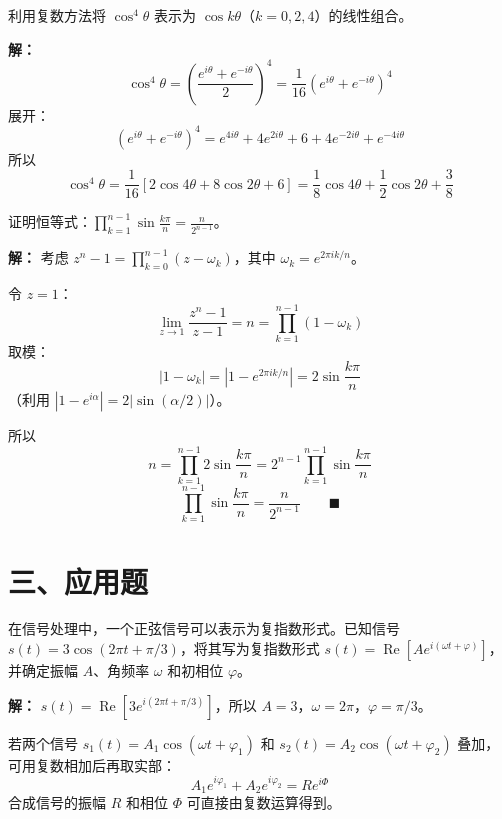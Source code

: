\documentclass[12pt, a4paper]{ctexart}
\begin{document}
\begin{examplebox}
利用复数方法将 $\cos^4\theta$ 表示为 $\cos k\theta$（$k=0,2,4$）的线性组合。
\end{examplebox}

\textbf{解：}
\[
  \cos^4\theta = \left(\frac{e^{i\theta}+e^{-i\theta}}{2}\right)^4
  = \frac{1}{16}(e^{i\theta}+e^{-i\theta})^4
\]
展开：
\[
  (e^{i\theta}+e^{-i\theta})^4 = e^{4i\theta}+4e^{2i\theta}+6+4e^{-2i\theta}+e^{-4i\theta}
\]
所以
\[
  \cos^4\theta = \frac{1}{16}\left[2\cos 4\theta + 8\cos 2\theta + 6\right]
  = \boxed{\frac{1}{8}\cos 4\theta + \frac{1}{2}\cos 2\theta + \frac{3}{8}}
\]

\begin{examplebox}[【例题10】综合——复数与三角恒等式]
证明恒等式：$\displaystyle\prod_{k=1}^{n-1}\sin\frac{k\pi}{n} = \frac{n}{2^{n-1}}$。
\end{examplebox}

\textbf{解：}
考虑 $z^n-1 = \displaystyle\prod_{k=0}^{n-1}(z-\omega_k)$，其中 $\omega_k=e^{2\pi ik/n}$。

令 $z=1$：
\[
  \lim_{z\to 1}\frac{z^n-1}{z-1} = n = \prod_{k=1}^{n-1}(1-\omega_k)
\]
取模：
\[
  |1-\omega_k| = |1-e^{2\pi ik/n}| = 2\sin\frac{k\pi}{n}
\]
（利用 $|1-e^{i\alpha}|=2|\sin(\alpha/2)|$）。

所以
\[
  n = \prod_{k=1}^{n-1}2\sin\frac{k\pi}{n} = 2^{n-1}\prod_{k=1}^{n-1}\sin\frac{k\pi}{n}
\]
\[
  \prod_{k=1}^{n-1}\sin\frac{k\pi}{n} = \frac{n}{2^{n-1}} \qquad\blacksquare
\]

\section*{\textcolor{apppurple}{三、应用题}}

\begin{appbox}[【应用1】信号处理中的复数]
在信号处理中，一个正弦信号可以表示为复指数形式。已知信号 $s(t) = 3\cos(2\pi t + \pi/3)$，将其写为复指数形式 $s(t) = \operatorname{Re}[Ae^{i(\omega t + \varphi)}]$，并确定振幅 $A$、角频率 $\omega$ 和初相位 $\varphi$。
\end{appbox}

\textbf{解：}
$s(t) = \operatorname{Re}[3e^{i(2\pi t+\pi/3)}]$，所以 $A=3$，$\omega=2\pi$，$\varphi=\pi/3$。

若两个信号 $s_1(t)=A_1\cos(\omega t+\varphi_1)$ 和 $s_2(t)=A_2\cos(\omega t+\varphi_2)$ 叠加，可用复数相加后再取实部：
\[
  A_1 e^{i\varphi_1}+A_2 e^{i\varphi_2} = Re^{i\Phi}
\]
合成信号的振幅 $R$ 和相位 $\Phi$ 可直接由复数运算得到。
\end{document}
